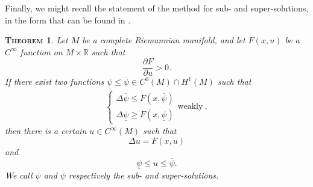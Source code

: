 \documentclass[a4paper,11pt,openright,twoside]{book}
\newcommand{\1}{\mathds{1}}
\theoremstyle{plain}
\newtheorem{thm}{\textsc{Theorem}}[chapter]
\theoremstyle{definition}
\theoremstyle{remark}
\begin{document}
Finally, we might recall the statement of the method for sub- and super-solutions, in the form that can be found in \cite{Wan1992}.
\begin{thm}\label{th:wan9}
	Let $M$ be a complete Riemannian manifold, and let $ F(x,u)$ be a $C^\infty$ function on $M\times \mathbb R$ such that \[ \frac{\partial F}{\partial u}>0. \]
	If there exist two functions $ \underline{\psi}\leq \overline{\psi} \in C^0(M)\cap H^1(M)$
	such that
		\begin{align*}
			\begin{cases}
				\Delta \overline{\psi} \leq F(x,\overline{\psi})\\
				\Delta \underline{\psi} \geq F(x,\underline{\psi})
			\end{cases} \text{weakly}
		\ , 
		\end{align*}
	then there is a certain $u\in C^\infty(M)$ such that
	\[
		\Delta u=F(x,u)
	\]
	and \[ \underline{\psi}\leq u\leq \overline{\psi}. \]
	We call $\underline{\psi}$ and $\overline{\psi}$ respectively the sub- and super-solutions.
\end{thm}
\end{document}
